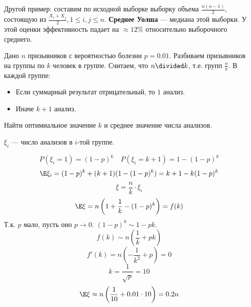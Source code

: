 Другой пример: составим по исходной выборке выборку объема \(\frac{n(n - 1)}{2}\), состоящую из \(\frac{X_i + X_j}{2}, 1 \leq i,j \leq n\). \textbf{Среднее Уолша} --- медиана этой выборки. У этой оценки эффективность падает на \(\approx 12\%\) относительно выборочного среднего.

\begin{exercise}
    Дано \(n\) призывников с вероятностью болезни \(p = 0.01\). Разбиваем призывников на группы по \(k\) человек в группе. Считаем, что \(n \divided k\), т.е. групп \(\frac{n}{k}\). В каждой группе:
    \begin{itemize}
        \item Если суммарный результат отрицательный, то \(1\) анализ.
        \item Иначе \(k + 1\) анализ.
    \end{itemize}

    Найти оптимиальное значение \(k\) и среднее значение числа анализов.
\end{exercise}
\begin{solution}
    \(\xi_i\) --- число анализов в \(i\)-той группе.

    \[P(\xi_i = 1) = (1 - p)^k \quad P(\xi_i = k + 1) = 1 - (1 - p)^k\]
    \[\E \xi_i = (1 - p)^k + (k + 1)(1 - (1 - p)^k) = k + 1 - k(1 - p)^k\]
    \[\xi = \frac{n}{k} \cdot \xi_i\]
    \[\E \xi = n\left(1 + \frac{1}{k} - (1 - p)^k\right) = f(k)\]
    Т.к. \(p\) мало, пусть оно \(p \to 0\). \((1 - p)^k \sim 1 - pk\).
    \[f(k) \sim n \left(\frac{1}{k} + pk\right)\]
    \[f'(k) = n \left( - \frac{1}{k^2} + p \right) = 0\]
    \[k = \frac{1}{\sqrt{p}} = 10\]
    \[\E \xi \approx n \left(\frac{1}{10} + 0.01 \cdot 10\right) = 0.2 n\]
\end{solution}
